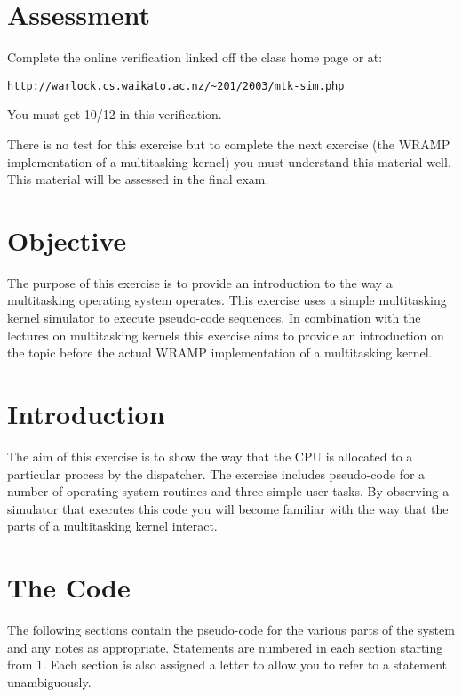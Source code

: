 \documentclass[a4paper,10pt]{article}
\begin{document}

\section{Assessment}

Complete the online verification linked off the class home page or
at:
\begin{center}\verb+http://warlock.cs.waikato.ac.nz/~201/2003/mtk-sim.php+\\
\end{center}
You must get 10/12 in this verification.

There is no test for this exercise but to complete the next exercise
(the WRAMP implementation of a multitasking kernel) you must
understand this material well.  This material will be assessed in the
final exam.

\section{Objective}

The purpose of this exercise is to provide an introduction to the way
a multitasking operating system operates. This exercise uses a simple
multitasking kernel simulator to execute pseudo-code sequences. In
combination with the lectures on multitasking kernels this exercise
aims to provide an introduction on the topic before the actual WRAMP
implementation of a multitasking kernel.

\section{Introduction} 

The aim of this exercise is to show the way that the CPU is
allocated to a particular process by the dispatcher. The exercise
includes pseudo-code for a number of operating system routines and
three simple user tasks.  By observing a simulator that
executes this code you will become familiar with the way that the
parts of a multitasking kernel interact.

\section{The Code}
The following sections contain the pseudo-code for the various parts
of the system and any notes as appropriate. Statements are numbered in
each section starting from 1.  Each section is also assigned a letter
to allow you to refer to a statement unambiguously.  
\end{document}
